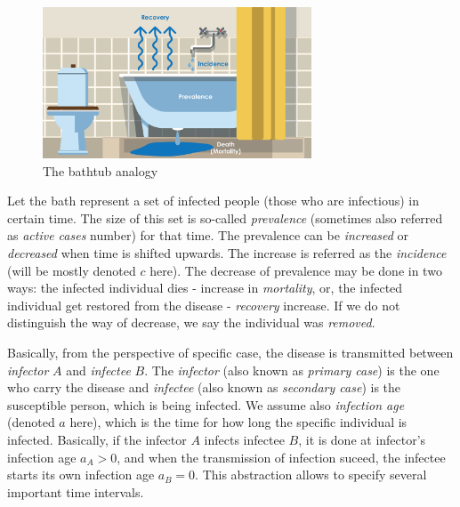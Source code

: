 \documentclass[
  digital, %
  oneside, %
  lof,     %
  lot,     %
]{fithesis4}
\begin{document}
\begin{figure}[h]
  \begin{center}
    \includegraphics[width=8cm]{static/images/epidemiologists-bathtub.png}
  \end{center}
  \caption{The bathtub analogy \cite{steward2020}}
  \label{fig:epidemiologists-bathtub}
\end{figure}

Let the bath represent a
set of infected people (those who are infectious) in certain time.
The size of this set is so-called \textit{prevalence} (sometimes also referred 
as \textit{active cases} number) for that time.
The prevalence can be \textit{increased} or \textit{decreased} when time is shifted upwards.
The increase is referred as the \textit{incidence} (will be mostly denoted $c$ here).
The decrease of prevalence may be done in two ways:
the infected individual dies - increase in \textit{mortality}, or, the
infected individual get restored from the disease - \textit{recovery} increase.
If we do not distinguish the way of decrease, we say the
individual was \textit{removed}.

Basically, from the perspective of specific case, the disease is
transmitted between \textit{infector} $A$ and \textit{infectee} $B$.
The \textit{infector} (also known as \textit{primary case}) is the one who carry the disease and
\textit{infectee} (also known as \textit{secondary case}) is the 
susceptible person, which is being infected.
We assume also \textit{infection age} (denoted $a$ here),
which is the time for how long the specific individual is infected.
Basically, if the infector $A$ infects infectee $B$, it is done at infector's
infection age $a_A > 0$, and when the transmission of infection suceed,
the infectee starts its own infection age $a_B = 0$.
This abstraction allows to specify several important time intervals.
\end{document}
